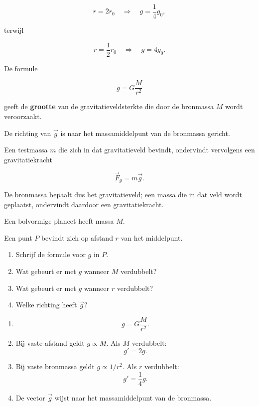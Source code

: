 \documentclass{ximera}
\begin{document}
\[
r=2r_0
\quad\Longrightarrow\quad
g=\frac14g_0,
\]

terwijl

\[
r=\frac12r_0
\quad\Longrightarrow\quad
g=4g_0.
\]


\begin{opmerking}

De formule

\[
\boxed{
g
=
G\frac{M}{r^2}
}
\]

geeft de \textbf{grootte} van de gravitatieveldsterkte die door de
bronmassa $M$ wordt veroorzaakt.

De richting van $\vec g$ is naar het massamiddelpunt van de
bronmassa gericht.

Een testmassa $m$ die zich in dat gravitatieveld bevindt, ondervindt
vervolgens een gravitatiekracht

\[
\boxed{
\vec F_g=m\vec g.
}
\]

De bronmassa bepaalt dus het gravitatieveld; een massa die in dat
veld wordt geplaatst, ondervindt daardoor een gravitatiekracht.

\end{opmerking}

\begin{oefening}[Gravitatieveld]{\oefB\ESS}

Een bolvormige planeet heeft massa $M$.

Een punt $P$ bevindt zich op afstand $r$ van het middelpunt.

\begin{enumerate}
  \item Schrijf de formule voor $g$ in $P$.
  \item Wat gebeurt er met $g$ wanneer $M$ verdubbelt?
  \item Wat gebeurt er met $g$ wanneer $r$ verdubbelt?
  \item Welke richting heeft $\vec g$?
\end{enumerate}


\begin{oplossing}

\begin{enumerate}
  \item
  \[
  \boxed{
  g=G\frac{M}{r^2}.
  }
  \]

  \item Bij vaste afstand geldt $g\propto M$. Als $M$ verdubbelt:
  \[
  \boxed{g'=2g.}
  \]

  \item Bij vaste bronmassa geldt $g\propto1/r^2$. Als $r$ verdubbelt:
  \[
  \boxed{g'=\frac14g.}
  \]

  \item De vector $\vec g$ wijst naar het massamiddelpunt van de
  bronmassa.
\end{enumerate}

\end{oplossing}

\end{oefening}
\end{document}
